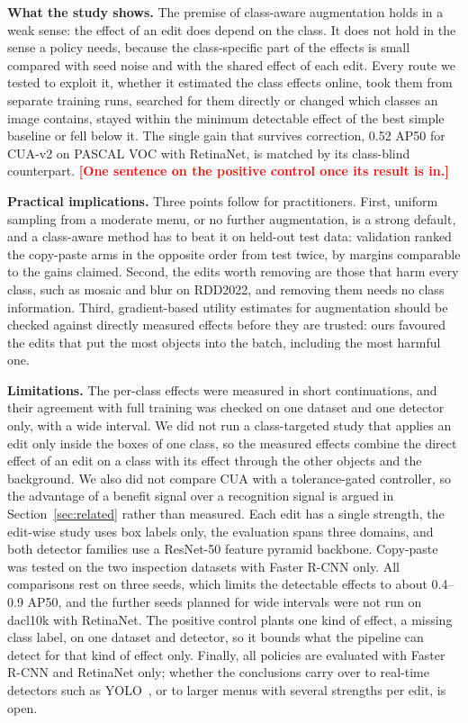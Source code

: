 \documentclass[conference]{IEEEtran}
\newcommand{\todo}[1]{\textcolor{red}{\textbf{[#1]}}}
\begin{document}
\noindent\textbf{What the study shows.} The premise of class-aware augmentation holds in a weak sense: the effect of an edit does depend on the class. It does not hold in the sense a policy needs, because the class-specific part of the effects is small compared with seed noise and with the shared effect of each edit. Every route we tested to exploit it, whether it estimated the class effects online, took them from separate training runs, searched for them directly or changed which classes an image contains, stayed within the minimum detectable effect of the best simple baseline or fell below it. The single gain that survives correction, 0.52 AP50 for CUA-v2 on PASCAL VOC with RetinaNet, is matched by its class-blind counterpart. \todo{One sentence on the positive control once its result is in.}

\noindent\textbf{Practical implications.} Three points follow for practitioners. First, uniform sampling from a moderate menu, or no further augmentation, is a strong default, and a class-aware method has to beat it on held-out test data: validation ranked the copy-paste arms in the opposite order from test twice, by margins comparable to the gains claimed. Second, the edits worth removing are those that harm every class, such as mosaic and blur on RDD2022, and removing them needs no class information. Third, gradient-based utility estimates for augmentation should be checked against directly measured effects before they are trusted: ours favoured the edits that put the most objects into the batch, including the most harmful one.

\noindent\textbf{Limitations.} The per-class effects were measured in short continuations, and their agreement with full training was checked on one dataset and one detector only, with a wide interval. We did not run a class-targeted study that applies an edit only inside the boxes of one class, so the measured effects combine the direct effect of an edit on a class with its effect through the other objects and the background. We also did not compare CUA with a tolerance-gated controller, so the advantage of a benefit signal over a recognition signal is argued in Section~\ref{sec:related} rather than measured. Each edit has a single strength, the edit-wise study uses box labels only, the evaluation spans three domains, and both detector families use a ResNet-50 feature pyramid backbone. Copy-paste was tested on the two inspection datasets with Faster R-CNN only. All comparisons rest on three seeds, which limits the detectable effects to about 0.4--0.9 AP50, and the further seeds planned for wide intervals were not run on dacl10k with RetinaNet. The positive control plants one kind of effect, a missing class label, on one dataset and detector, so it bounds what the pipeline can detect for that kind of effect only. Finally, all policies are evaluated with Faster R-CNN and RetinaNet only; whether the conclusions carry over to real-time detectors such as YOLO~\cite{bochkovskiy2020yolov4}, or to larger menus with several strengths per edit, is open.




\end{document}
